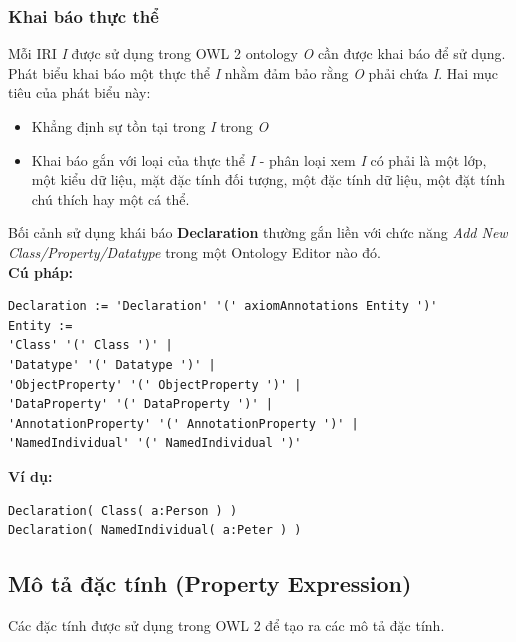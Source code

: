 \subsubsection{Khai báo thực thể}
Mỗi IRI \textit{I} được sử dụng trong OWL 2 ontology \textit{O} cần được khai báo để sử dụng. Phát biểu khai báo một thực thể \textit{I} nhằm đảm bảo rằng \textit{O} phải chứa \textit{I}. Hai mục tiêu của phát biểu này:
\begin{itemize}
\item Khẳng định sự tồn tại trong \textit{I} trong \textit{O}
\item Khai báo gắn với loại của thực thể \textit{I} - phân loại xem \textit{I} có phải là một lớp, một kiểu dữ liệu, mặt đặc tính đối tượng, một đặc tính dữ liệu, một đặt tính chú thích hay một cá thể.
\end{itemize}
Bối cảnh sử dụng khái báo \textbf{Declaration} thường gắn liền với chức năng \textit{Add New Class/Property/Datatype} trong một Ontology Editor nào đó.
\\ \textbf{Cú pháp:}
\begin{verbatim}
Declaration := 'Declaration' '(' axiomAnnotations Entity ')'
Entity :=
'Class' '(' Class ')' |
'Datatype' '(' Datatype ')' |
'ObjectProperty' '(' ObjectProperty ')' |
'DataProperty' '(' DataProperty ')' |
'AnnotationProperty' '(' AnnotationProperty ')' |
'NamedIndividual' '(' NamedIndividual ')'
\end{verbatim}
\textbf{Ví dụ:}
\begin{verbatim}
Declaration( Class( a:Person ) )
Declaration( NamedIndividual( a:Peter ) )
\end{verbatim}

\subsection{Mô tả đặc tính (Property Expression)}
Các đặc tính được sử dụng trong OWL 2 để tạo ra các mô tả đặc tính.

